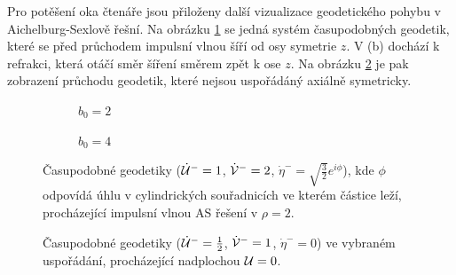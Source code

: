 Pro potěšení oka čtenáře jsou přiloženy další vizualizace geodetického pohybu v Aichelburg-Sexlově řešní. Na obrázku \ref{fig:AsMatter02} se jedná systém časupodobných geodetik, které se před
průchodem impulsní vlnou šíří od osy symetrie $z$. V (b) dochází k refrakci, která otáčí směr šíření směrem zpět k ose $z$.
Na obrázku \ref{fig:AsMatterNonAxial} je pak zobrazení průchodu geodetik, které nejsou uspořádáný axiálně symetricky.

\begin{figure}[ht]
    \centering
    \begin{subfigure}[b]{0.45\textwidth}
        \caption{$b_0 = 2$}
    \end{subfigure}
    \hfill
    \begin{subfigure}[b]{0.45\textwidth}
        \caption{$b_0 = 4$}
    \end{subfigure}
    \caption{Časupodobné geodetiky ($\dot {\mathcal{U}}^-=1$, $\dot {\mathcal{V}}^-=2$, $\dot \eta^-=\sqrt{\frac{3}{2}} e^{i \phi}$), kde $\phi$ odpovídá úhlu v
    cylindrických souřadnicích ve kterém částice leží, procházející impulsní vlnou AS řešení v $\rho=2$.}
    \label{fig:AsMatter02}
\end{figure}

\begin{figure}[ht]
    \centering
    \caption{Časupodobné geodetiky ($\dot {\mathcal{U}}^-=\frac{1}{2}$, $\dot {\mathcal{V}}^-=1$, $\dot \eta^-=0$) ve vybraném uspořádání, procházející nadplochou $\mathcal{U} = 0$.}
    \label{fig:AsMatterNonAxial}
\end{figure}

